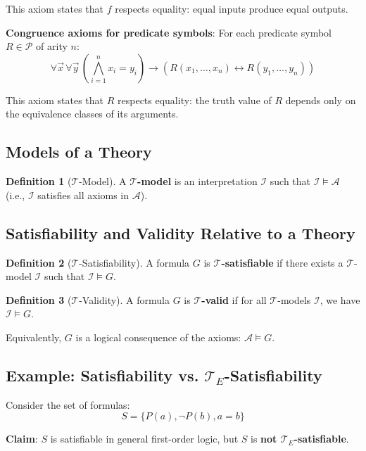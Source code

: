 \documentclass[11pt,a4paper]{article}
\theoremstyle{definition}
\newtheorem{definition}{Definition}[section]
\theoremstyle{plain}
\theoremstyle{remark}
\begin{document}
This axiom states that $f$ respects equality: equal inputs produce equal outputs.

\textbf{Congruence axioms for predicate symbols}: For each predicate symbol $R \in \mathcal{P}$ of arity $n$:
\[
\forall \vec{x} \, \forall \vec{y} \, \left( \bigwedge_{i=1}^{n} x_i = y_i \right) \rightarrow (R(x_1, \dots, x_n) \leftrightarrow R(y_1, \dots, y_n))
\]

This axiom states that $R$ respects equality: the truth value of $R$ depends only on the equivalence classes of its arguments.

\subsection{Models of a Theory}

\begin{definition}[$\mathcal{T}$-Model]
A \textbf{$\mathcal{T}$-model} is an interpretation $\mathcal{I}$ such that $\mathcal{I} \models \mathcal{A}$ (i.e., $\mathcal{I}$ satisfies all axioms in $\mathcal{A}$).
\end{definition}

\subsection{Satisfiability and Validity Relative to a Theory}

\begin{definition}[$\mathcal{T}$-Satisfiability]
A formula $G$ is \textbf{$\mathcal{T}$-satisfiable} if there exists a $\mathcal{T}$-model $\mathcal{I}$ such that $\mathcal{I} \models G$.
\end{definition}

\begin{definition}[$\mathcal{T}$-Validity]
A formula $G$ is \textbf{$\mathcal{T}$-valid} if for all $\mathcal{T}$-models $\mathcal{I}$, we have $\mathcal{I} \models G$.

Equivalently, $G$ is a logical consequence of the axioms: $\mathcal{A} \models G$.
\end{definition}

\subsection{Example: Satisfiability vs. $\mathcal{T}_E$-Satisfiability}

Consider the set of formulas:
\[
S = \{ P(a), \neg P(b), a = b \}
\]

\textbf{Claim}: $S$ is satisfiable in general first-order logic, but $S$ is \textbf{not $\mathcal{T}_E$-satisfiable}.
\end{document}

